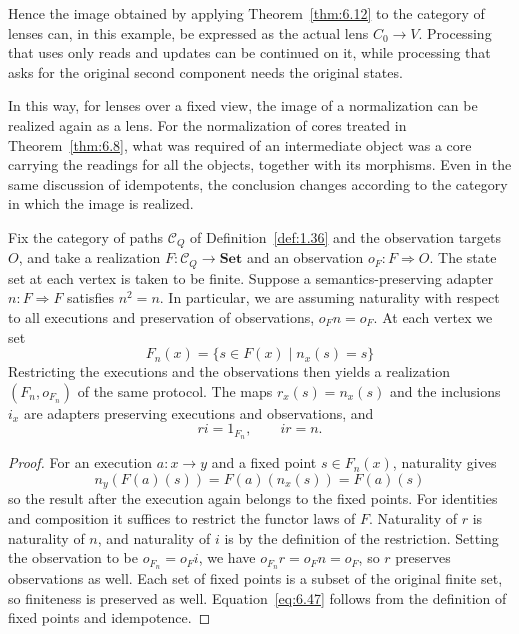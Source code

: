 Hence the image obtained by applying Theorem~\ref{thm:6.12} to the category of lenses can,
in this example, be expressed as the actual lens $C_0\to V$.
Processing that uses only reads and updates can be continued on it, while processing that
asks for the original second component needs the original states.

In this way, for lenses over a fixed view, the image of a normalization can be realized
again as a lens.
For the normalization of cores treated in Theorem~\ref{thm:6.8}, what was required of an intermediate object was a core carrying the readings for all
the objects, together with its
morphisms.
Even in the same discussion of idempotents, the conclusion changes according to the
category in which the image is realized.

\begin{proposition}\label{prop:6.31}

Fix the category of paths $\mathcal{C}_Q$ of Definition~\ref{def:1.36} and the observation
targets $O$, and take a realization $F:\mathcal{C}_Q\to{\mathbf{Set}}$ and an observation
$o_F:F\Rightarrow O$.
The state set at each vertex is taken to be finite.
Suppose a semantics-preserving adapter $n:F\Rightarrow F$ satisfies $n^2=n$.
In particular, we are assuming naturality with respect to all executions and preservation
of observations, $o_Fn=o_F$.
At each vertex we set
\begin{equation*}
F_n(x)=\{s\in F(x)\mid n_x(s)=s\}
\tag{6.46}\label{eq:6.46}
\end{equation*}
Restricting the executions and the observations then yields a realization $(F_n,o_{F_n})$
of the same protocol.
The maps $r_x(s)=n_x(s)$ and the inclusions $i_x$ are adapters preserving executions and
observations, and
\begin{equation*}
ri=1_{F_n},\qquad ir=n.
\tag{6.47}\label{eq:6.47}
\end{equation*}

\end{proposition}

\begin{proof}

For an execution $a:x\to y$ and a fixed point $s\in F_n(x)$, naturality gives
\begin{equation*}
n_y(F(a)(s))=F(a)(n_x(s))=F(a)(s)
\tag{6.48}\label{eq:6.48}
\end{equation*}
so the result after the execution again belongs to the fixed points.
For identities and composition it suffices to restrict the functor laws of $F$.
Naturality of $r$ is naturality of $n$, and naturality of $i$ is by the definition of the
restriction.
Setting the observation to be $o_{F_n}=o_Fi$, we have $o_{F_n}r=o_Fn=o_F$, so $r$ preserves
observations as well.
Each set of fixed points is a subset of the original finite set, so finiteness is preserved
as well.
Equation~\eqref{eq:6.47} follows from the definition of fixed points and idempotence.

\end{proof}

